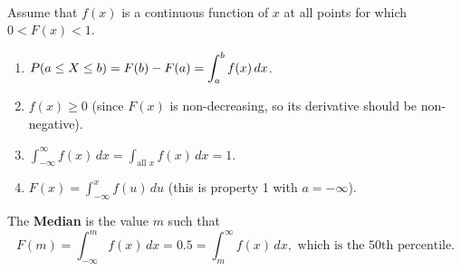 \pagebreak


\begin{theorem}
    \phantom{}\\
    Assume that $f(x)$ is a continuous function of $x$ at  all points for which $0 < F(x) < 1$.
\begin{enumerate}
    \item $\displaystyle P(a \leq X \leq b) = F(b) - F(a) = \int_{a}^{b} f(x) \, dx$. \vspace{1mm}
    \item $f(x) \geq 0$ (since $F(x)$ is non-decreasing, so its derivative should be non-negative). \vspace{1mm}
    \item $\displaystyle \int_{-\infty}^{\infty} f(x) \, dx = \displaystyle \int_{\text{all $x$}} f(x) \, dx = 1$.
    \item $F(x) = \displaystyle \int_{-\infty}^{x} f(u) \, du$ (this is property 1 with $a = -\infty$). \\
\end{enumerate}
\end{theorem}


\begin{remark}
    The \textbf{Median} is the value $m$ such that
    \[
        F(m) = \displaystyle \int_{-\infty}^{m} f(x) \, dx = 0.5 = \displaystyle \int_{m}^{\infty} f(x) \, dx, \text{ which is the 50th percentile.}
    \]
\end{remark}

